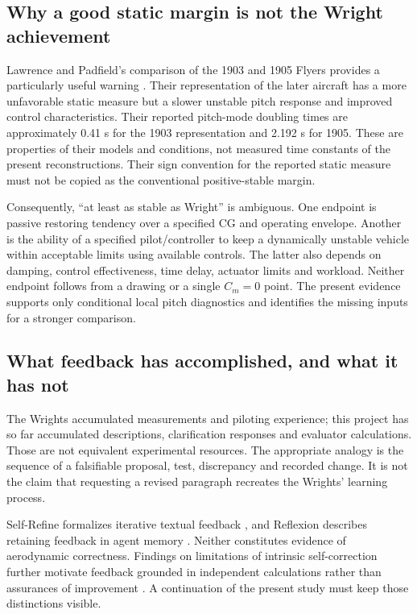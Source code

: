 \documentclass[10pt,letterpaper]{article}
\begin{document}
\subsection{Why a good static margin is not the Wright achievement}
Lawrence and Padfield's comparison of the 1903 and 1905 Flyers provides a particularly useful warning \cite{ref10}. Their representation of the later aircraft has a more unfavorable static measure but a slower unstable pitch response and improved control characteristics. Their reported pitch-mode doubling times are approximately 0.41 s for the 1903 representation and 2.192 s for 1905. These are properties of their models and conditions, not measured time constants of the present reconstructions. Their sign convention for the reported static measure must not be copied as the conventional positive-stable margin.

Consequently, ``at least as stable as Wright'' is ambiguous. One endpoint is passive restoring tendency over a specified CG and operating envelope. Another is the ability of a specified pilot/controller to keep a dynamically unstable vehicle within acceptable limits using available controls. The latter also depends on damping, control effectiveness, time delay, actuator limits and workload. Neither endpoint follows from a drawing or a single $C_m=0$ point. The present evidence supports only conditional local pitch diagnostics and identifies the missing inputs for a stronger comparison.

\subsection{What feedback has accomplished, and what it has not}
The Wrights accumulated measurements and piloting experience; this project has so far accumulated descriptions, clarification responses and evaluator calculations. Those are not equivalent experimental resources. The appropriate analogy is the sequence of a falsifiable proposal, test, discrepancy and recorded change. It is not the claim that requesting a revised paragraph recreates the Wrights' learning process.

Self-Refine formalizes iterative textual feedback \cite{ref30}, and Reflexion describes retaining feedback in agent memory \cite{ref32}. Neither constitutes evidence of aerodynamic correctness. Findings on limitations of intrinsic self-correction further motivate feedback grounded in independent calculations rather than assurances of improvement \cite{ref31}. A continuation of the present study must keep those distinctions visible.
\end{document}
